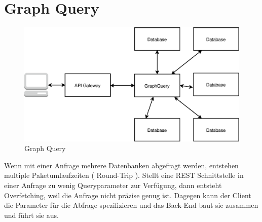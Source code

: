 \documentclass[
12pt,
english,
ngerman,
headsepline,
twoside,
openright,
numbers=noenddot,version=first
]{scrreprt}
\begin{document}
\section{Graph Query}
\begin{figure}[H]
	\centering
		\includegraphics[scale=0.60]{./pics/GraphQuery.eps}
	\caption{Graph Query}
	\label{pic:graph-query}
\end{figure}
Wenn mit einer Anfrage mehrere Datenbanken abgefragt werden, entstehen multiple Paketumlaufzeiten ( Round-Trip ). Stellt eine \acrshort{REST} Schnittstelle in einer Anfrage zu wenig Queryparameter zur Verfügung, dann entsteht Overfetching, weil die Anfrage nicht präzise genug ist. Dagegen kann der Client die Parameter für die Abfrage spezifizieren und das Back-End baut sie zusammen und führt sie aus.
\end{document}
